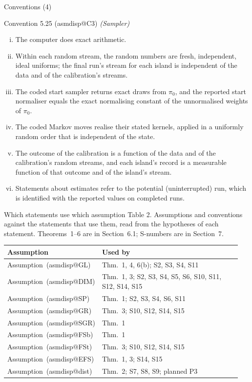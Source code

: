 \documentclass[aspectratio=169]{beamer}
\makeatletter
\newcommand{\asmdisp}[1]{\csname asmdisp@#1\endcsname}
\newcommand{\as}[1]{\textup{(\asmdisp{#1})}}
\makeatother
\begin{document}
\begin{frame}{Conventions (4)}
\small
\begin{block}{Convention 5.25 (\asmdisp{C3}) \textit{(Sampler)}}
\begin{enumerate}[(i)]
  \item The computer does exact arithmetic.
  \item Within each random stream, the random numbers are fresh, independent, ideal uniforms; the final run's stream for
    each island is independent of the data and of the calibration's streams.
  \item The coded start sampler returns exact draws from $\pi_0$, and the reported start normaliser equals the exact
    normalising constant of the unnormalised weights of $\pi_0$.
  \item The coded Markov moves realise their stated kernels, applied in a uniformly random order that is independent of
    the state.
  \item The outcome of the calibration is a function of the data and of the calibration's random streams, and each island's
    record is a measurable function of that outcome and of the island's stream.
  \item Statements about estimates refer to the potential (uninterrupted) run, which is identified with the reported
    values on completed runs.
\end{enumerate}
\end{block}
\end{frame}

\begin{frame}{Which statements use which assumption}
\footnotesize
{\footnotesize Table 2. Assumptions and conventions against the statements that use them, read from the hypotheses of each statement.
Theorems~1--6 are in Section~6.1; S-numbers are in Section~7.}
\smallskip

\begin{tabular}{@{}>{\raggedright\arraybackslash}p{0.27\linewidth}>{\raggedright\arraybackslash}p{0.68\linewidth}@{}}
\toprule
Assumption & Used by \\
\midrule
Assumption~\as{GL} & Thm.~1, 4, 6(b); S2, S3, S4, S11 \\
Assumption~\as{DIM} & Thm.~1, 3; S2, S3, S4, S5, S6, S10, S11, S12, S14, S15 \\
Assumption~\as{SP} & Thm.~1; S2, S3, S4, S6, S11 \\
Assumption~\as{GR} & Thm.~3; S10, S12, S14, S15 \\
Assumption~\as{SGR} & Thm.~1 \\
Assumption~\as{FSb} & Thm.~1 \\
Assumption~\as{FSt} & Thm.~3; S10, S12, S14, S15 \\
Assumption~\as{EFS} & Thm.~1, 3; S14, S15 \\
Assumption~\as{dist} & Thm.~2; S7, S8, S9; planned P3 \\
\bottomrule
\end{tabular}
\end{frame}
\end{document}
